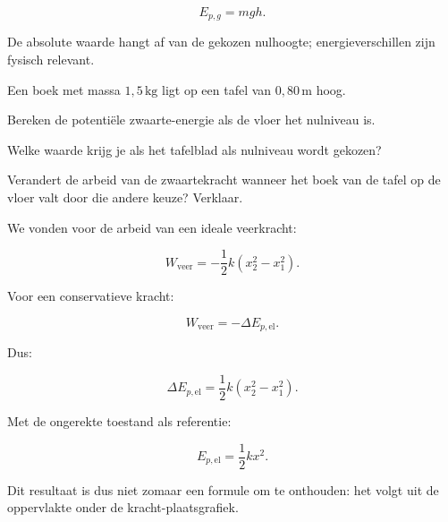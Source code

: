 \documentclass{ximera}
\begin{document}
\[
\boxed{
E_{p,g}=mgh.
}
\]

De absolute waarde hangt af van de gekozen nulhoogte; energieverschillen zijn
fysisch relevant.


\begin{oefening}{\oefB}

Een boek met massa $1{,}5\,\mathrm{kg}$ ligt op een tafel van
$0{,}80\,\mathrm m$ hoog.

\begin{question}
Bereken de potentiële zwaarte-energie als de vloer het nulniveau is.
\end{question}

\begin{question}
Welke waarde krijg je als het tafelblad als nulniveau wordt gekozen?
\end{question}

\begin{question}
Verandert de arbeid van de zwaartekracht wanneer het boek van de tafel op de
vloer valt door die andere keuze? Verklaar.
\end{question}

\end{oefening}



We vonden voor de arbeid van een ideale veerkracht:

\[
W_{\mathrm{veer}}
=
-\frac12k(x_2^2-x_1^2).
\]

Voor een conservatieve kracht:

\[
W_{\mathrm{veer}}=-\Delta E_{p,\mathrm{el}}.
\]

Dus:

\[
\Delta E_{p,\mathrm{el}}
=
\frac12k(x_2^2-x_1^2).
\]

Met de ongerekte toestand als referentie:

\[
\boxed{
E_{p,\mathrm{el}}=\frac12kx^2.
}
\]

Dit resultaat is dus niet zomaar een formule om te onthouden: het volgt uit
de oppervlakte onder de kracht-plaatsgrafiek.
\end{document}
